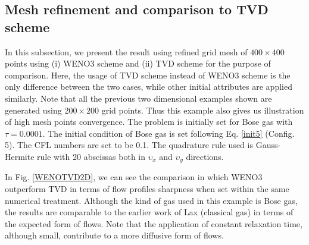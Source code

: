 \documentclass{rsproca}%
\begin{document}
\subsection{Mesh refinement and comparison to TVD scheme}
In this subsection, we present the result using refined grid mesh of $400 \times 400$ points using (i) WENO3 scheme and (ii) TVD scheme for the purpose of comparison. Here, the usage of TVD scheme instead of WENO3 scheme is the only difference between the two cases, while other initial attributes are applied similarly. Note that all the previous two dimensional examples shown are generated using $200 \times 200$ grid points. Thus this example also gives us illustration of high mesh points convergence. The problem is initially set for Bose gas with $\tau = 0.0001$. The initial condition of Bose gas is set following Eq. \ref{init5} (Config. 5). The CFL numbers are set to be 0.1. The quadrature rule used is Gauss-Hermite rule with 20 abscissas both in $\upsilon_x$ and $\upsilon_y$ directions.

In Fig. \ref{WENOTVD2D}, we can see the comparison in which WENO3 outperform TVD in terms of flow profiles sharpness when set within the same numerical treatment. Although the kind of gas used in this example is Bose gas, the results are comparable to the earlier work of Lax \cite{Laxliu95} (classical gas) in terms of the expected form of flows. Note that the application of constant relaxation time, although small, contribute to a more diffusive form of flows.
\end{document}
